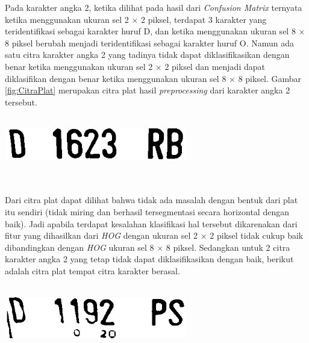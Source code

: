 \noindent Pada karakter angka 2, ketika dilihat pada hasil dari \textit{Confusion Matrix} ternyata ketika menggunakan ukuran sel 2 $\times$ 2 piksel, terdapat 3 karakter yang teridentifikasi sebagai karakter huruf D, dan ketika menggunakan ukuran sel 8 $\times$ 8 piksel berubah menjadi teridentifikasi sebagai karakter huruf O. Namun ada satu citra karakter angka 2 yang tadinya tidak dapat diklasifikasikan dengan benar ketika menggunakan ukuran sel 2 $\times$ 2 piksel dan menjadi dapat diklasifikan dengan benar ketika menggunakan ukuran sel 8 $\times$ 8 piksel. Gambar \ref{fig:CitraPlat} merupakan citra plat hasil \textit{preprocessing} dari karakter angka 2 tersebut.\\
\\
\begin{adjustbox}{width=1\textwidth}
	\noindent\begin{minipage}{\linewidth}
		\centering\includegraphics[width=8cm]{images/D1623RB.png}
		\label{fig:CitraPlat}
	\end{minipage}
\end{adjustbox}\\
\\
\noindent Dari citra plat dapat dilihat bahwa tidak ada masalah dengan bentuk dari plat itu sendiri (tidak miring dan berhasil tersegmentasi secara horizontal dengan baik). Jadi apabila terdapat kesalahan klasifikasi hal tersebut dikarenakan dari fitur yang dihasilkan dari \textit{HOG} dengan ukuran sel 2 $\times$ 2 piksel tidak cukup baik dibandingkan dengan \textit{HOG} ukuran sel 8 $\times$ 8 piksel. Sedangkan untuk 2 citra karakter angka 2 yang tetap tidak dapat diklasifikasikan dengan baik, berikut adalah citra plat tempat citra karakter berasal.\\
\\
\begin{adjustbox}{width=1\textwidth}
	\noindent\begin{minipage}{\linewidth}
		\centering\includegraphics[width=8cm]{images/D1192PS.png}
	\end{minipage}
\end{adjustbox}\\
